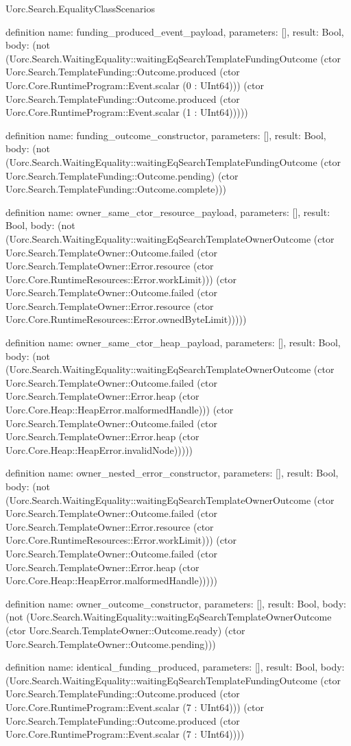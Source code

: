 \begin{lexlean}{Uorc.Search.EqualityClassScenarios}
\begin{semanticmodule}
definition{
  name: funding_produced_event_payload,
  parameters: [],
  result: Bool,
  body: (not (Uorc.Search.WaitingEquality::waitingEqSearchTemplateFundingOutcome (ctor Uorc.Search.TemplateFunding::Outcome.produced (ctor Uorc.Core.RuntimeProgram::Event.scalar (0 : UInt64))) (ctor Uorc.Search.TemplateFunding::Outcome.produced (ctor Uorc.Core.RuntimeProgram::Event.scalar (1 : UInt64)))))
}

definition{
  name: funding_outcome_constructor,
  parameters: [],
  result: Bool,
  body: (not (Uorc.Search.WaitingEquality::waitingEqSearchTemplateFundingOutcome (ctor Uorc.Search.TemplateFunding::Outcome.pending) (ctor Uorc.Search.TemplateFunding::Outcome.complete)))
}

definition{
  name: owner_same_ctor_resource_payload,
  parameters: [],
  result: Bool,
  body: (not (Uorc.Search.WaitingEquality::waitingEqSearchTemplateOwnerOutcome (ctor Uorc.Search.TemplateOwner::Outcome.failed (ctor Uorc.Search.TemplateOwner::Error.resource (ctor Uorc.Core.RuntimeResources::Error.workLimit))) (ctor Uorc.Search.TemplateOwner::Outcome.failed (ctor Uorc.Search.TemplateOwner::Error.resource (ctor Uorc.Core.RuntimeResources::Error.ownedByteLimit)))))
}

definition{
  name: owner_same_ctor_heap_payload,
  parameters: [],
  result: Bool,
  body: (not (Uorc.Search.WaitingEquality::waitingEqSearchTemplateOwnerOutcome (ctor Uorc.Search.TemplateOwner::Outcome.failed (ctor Uorc.Search.TemplateOwner::Error.heap (ctor Uorc.Core.Heap::HeapError.malformedHandle))) (ctor Uorc.Search.TemplateOwner::Outcome.failed (ctor Uorc.Search.TemplateOwner::Error.heap (ctor Uorc.Core.Heap::HeapError.invalidNode)))))
}

definition{
  name: owner_nested_error_constructor,
  parameters: [],
  result: Bool,
  body: (not (Uorc.Search.WaitingEquality::waitingEqSearchTemplateOwnerOutcome (ctor Uorc.Search.TemplateOwner::Outcome.failed (ctor Uorc.Search.TemplateOwner::Error.resource (ctor Uorc.Core.RuntimeResources::Error.workLimit))) (ctor Uorc.Search.TemplateOwner::Outcome.failed (ctor Uorc.Search.TemplateOwner::Error.heap (ctor Uorc.Core.Heap::HeapError.malformedHandle)))))
}

definition{
  name: owner_outcome_constructor,
  parameters: [],
  result: Bool,
  body: (not (Uorc.Search.WaitingEquality::waitingEqSearchTemplateOwnerOutcome (ctor Uorc.Search.TemplateOwner::Outcome.ready) (ctor Uorc.Search.TemplateOwner::Outcome.pending)))
}

definition{
  name: identical_funding_produced,
  parameters: [],
  result: Bool,
  body: (Uorc.Search.WaitingEquality::waitingEqSearchTemplateFundingOutcome (ctor Uorc.Search.TemplateFunding::Outcome.produced (ctor Uorc.Core.RuntimeProgram::Event.scalar (7 : UInt64))) (ctor Uorc.Search.TemplateFunding::Outcome.produced (ctor Uorc.Core.RuntimeProgram::Event.scalar (7 : UInt64))))
}


\end{semanticmodule}
\end{lexlean}
